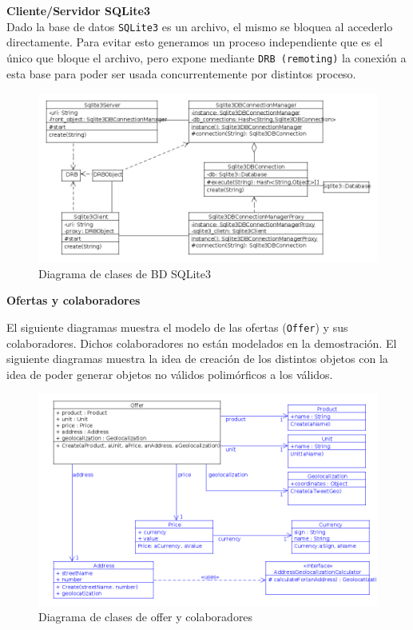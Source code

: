 \textbf{Cliente/Servidor SQLite3}\\

Dado la base de datos \texttt{SQLite3} es un archivo, el mismo se bloquea al accederlo
directamente. Para evitar esto generamos un proceso independiente que es el \'unico que bloque el archivo, pero expone mediante \texttt{DRB (remoting)} la conexi\'on a esta base para poder ser usada concurrentemente por distintos proceso.

\begin{figure}[h]
\centerline{\includegraphics[width=0.9\paperwidth]{./imgs/class_diagram_sqlite3_client_server.png}}
\caption{Diagrama de clases de BD SQLite3}
\label{fig:class_sqlite3_client_server}
\end{figure}

\textbf{Ofertas y colaboradores}

El siguiente diagramas muestra el modelo de las ofertas (\texttt{Offer}) y sus colaboradores. Dichos colaboradores no est\'an modelados en la demostraci\'on.
El siguiente diagramas muestra la idea de creaci\'on de los distintos objetos
con la idea de poder generar objetos no v\'alidos polim\'orficos a los v\'alidos.

\begin{figure}[h]
\centerline{\includegraphics[width=0.9\paperwidth]{./imgs/class_diagram_offer.png}}
\caption{Diagrama de clases de offer y colaboradores}
\label{fig:class_offer}
\end{figure}

